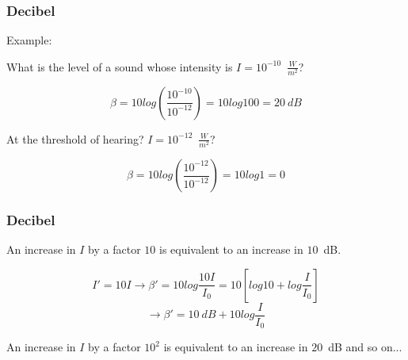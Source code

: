 \documentclass[]{beamer}
\begin{document}

\begin{frame}
\frametitle{Decibel}

Example: 

\vspace{3mm}

What is  the level of a sound whose intensity is $I=10^{-10}$~$\frac{W}{m^2}$?

\pause

\begin{equation}
\beta =10 log\left(\frac{10^{-10}}{10^{-12}}\right)=10log100=20~dB
\end{equation}

\pause
\vspace{3mm}
At the threshold of hearing?  $I=10^{-12}$~$\frac{W}{m^2}$?

\begin{equation}
\beta =10 log\left(\frac{10^{-12}}{10^{-12}}\right)=10log1=0
\end{equation}

  \end{frame}


\begin{frame}
\frametitle{Decibel}

An increase in $I$ by a factor $10$ is equivalent to an increase in $10$~dB.
\pause

\begin{equation*}
I'=10I\rightarrow \beta'=10 log \frac{10I}{I_0}=10[log 10+log\frac{I}{I_0} ]
\end{equation*}
\pause
\begin{equation*}
\rightarrow\beta'=10~dB+10log\frac{I}{I_0} 
\end{equation*}
\pause

An increase in $I$ by a factor $10^2$ is equivalent to an increase in $20$~dB and so on...



  \end{frame}

\end{document}
